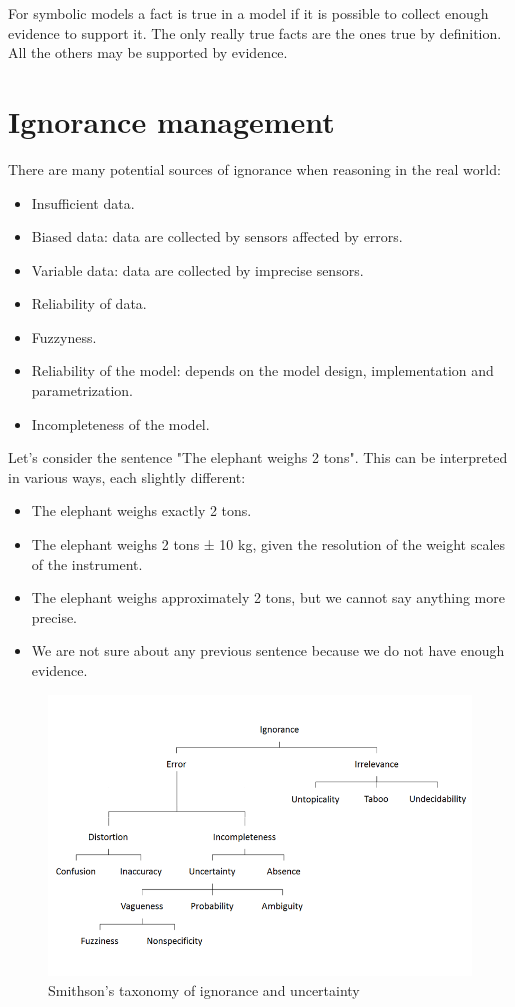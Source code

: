 \documentclass[12pt, a4paper]{report}
\theoremstyle{remark}
\begin{document}
    For symbolic models a fact is true in a model if it is possible to collect enough evidence to support it. The only really true facts 
    are the ones true by definition. All the others may be supported by evidence. 
    
    \section{Ignorance management}
    There are many potential sources of ignorance when reasoning in the real world:
    \begin{itemize}
        \item Insufficient data.
        \item Biased data: data are collected by sensors affected by errors. 
        \item Variable data: data are collected by imprecise sensors.
        \item Reliability of data. 
        \item Fuzzyness. 
        \item Reliability of the model: depends on the model design, implementation and parametrization. 
        \item Incompleteness of the model. 
    \end{itemize}
    \begin{example}
        Let’s consider the sentence "The elephant weighs 2 tons". This can be interpreted in various ways, each slightly different:
        \begin{itemize}
            \item The elephant weighs exactly 2 tons.
            \item The elephant weighs 2 tons ± 10 kg, given the resolution of the weight scales of the instrument.
            \item The elephant weighs approximately 2 tons, but we cannot say anything more precise.
            \item We are not sure about any previous sentence because we do not have enough evidence.
        \end{itemize}
    \end{example}
    \begin{figure}[H]
        \centering
        \includegraphics[width=1\linewidth]{images/smithson.png}
        \caption{Smithson's taxonomy of ignorance and uncertainty}
    \end{figure}
\end{document}
